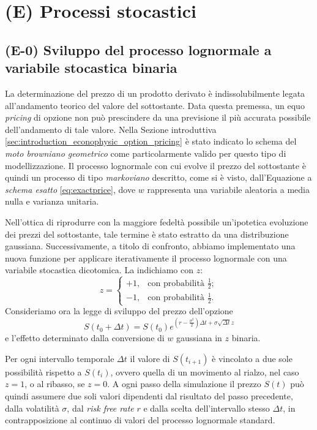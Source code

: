 \chapter{(E) Processi stocastici} \label{cap:bimodal}

\section{(E-0) Sviluppo del processo lognormale a variabile stocastica binaria}

La determinazione del prezzo di un prodotto derivato è indissolubilmente legata all'andamento teorico del valore del sottostante. Data questa premessa, un equo \textit{pricing} di opzione non può prescindere da una previsione il più accurata possibile dell'andamento di tale valore. Nella Sezione introduttiva \ref{sec:introduction_econophysic_option_pricing} è stato indicato lo schema del \textit{moto browniano geometrico} come particolarmente valido per questo tipo di modellizzazione. Il processo lognormale con cui evolve il prezzo del sottostante è quindi un processo di tipo \textit{markoviano} descritto, come si è visto, dall'Equazione a \textit{schema esatto} \eqref{eq:exactprice}, dove $w$ rappresenta una variabile aleatoria a media nulla e varianza unitaria.

Nell'ottica di riprodurre con la maggiore fedeltà possibile un'ipotetica evoluzione dei prezzi del sottostante, tale termine è stato estratto da una distribuzione gaussiana. Successivamente, a titolo di confronto, abbiamo implementato una nuova funzione per applicare iterativamente il processo lognormale con una variabile stocastica dicotomica. La indichiamo con $z$:
\begin{equation}
    z = \begin{cases}
    +1, & \text{con probabilità} \,\, \frac{1}{2};\\
    -1, & \text{con probabilità} \,\, \frac{1}{2}.
  \end{cases}
    \label{eq:binary_variable}
\end{equation}
Consideriamo ora la legge di sviluppo del prezzo dell'opzione
\begin{equation}
    S(t_0 + \Delta t) = S(t_0) e^{(r - \frac{\sigma^2}{2}) \Delta t + \sigma \sqrt{\Delta t} z}
    \label{eq:bimodal_price}
\end{equation}
e l'effetto determinato dalla conversione di $w$ gaussiana in $z$ binaria.

Per ogni intervallo temporale $\Delta t$ il valore di $S(t_{i + 1})$ è vincolato a due sole possibilità rispetto a $S(t_i)$, ovvero quella di un movimento al rialzo, nel caso $z = 1$, o al ribasso, se $z = 0$. A ogni passo della simulazione il prezzo $S(t)$ può quindi assumere due soli valori dipendenti dal risultato del passo precedente, dalla volatilità $\sigma$, dal \textit{risk free rate} $r$ e dalla scelta dell'intervallo stesso $\Delta t$, in contrapposizione al continuo di valori del processo lognormale standard.

